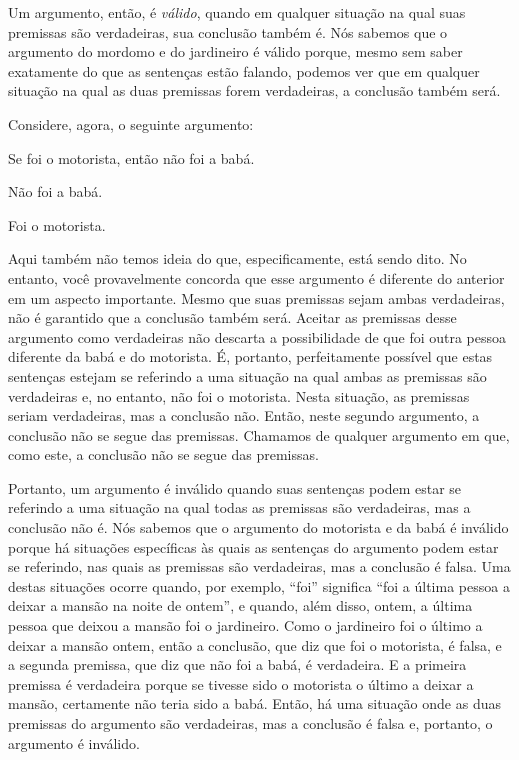 Um argumento, então, é \emph{válido}, quando em qualquer situação na qual suas premissas são verdadeiras, sua conclusão também é.
Nós sabemos que o argumento do mordomo e do jardineiro é válido porque, mesmo sem saber exatamente do que as sentenças estão falando, podemos ver que em qualquer situação na qual as duas premissas forem verdadeiras, a conclusão também será.

Considere, agora, o seguinte argumento:
\begin{earg}\label{argMaidDriver}
	\item[] Se foi o motorista, então não foi a babá.
	\item[] Não foi a babá.
	\item[\therefore] Foi o motorista.
\end{earg}
Aqui também não temos ideia do que, especificamente, está sendo dito.
No entanto, você provavelmente concorda que esse argumento é diferente do anterior em um aspecto importante.
Mesmo que suas premissas sejam ambas verdadeiras, não é garantido que a conclusão também será.
Aceitar as premissas desse argumento como verdadeiras não descarta a possibilidade de que foi outra pessoa diferente da babá e do motorista.
É, portanto, perfeitamente possível que estas sentenças estejam se referindo a uma situação na qual ambas as premissas são verdadeiras e, no entanto, não foi o motorista.
Nesta situação, as premissas seriam verdadeiras, mas a conclusão não.
Então, neste segundo argumento, a conclusão não se segue das premissas.
Chamamos de  qualquer argumento em que, como este, a conclusão não se segue das premissas.

Portanto, um argumento é inválido quando suas sentenças podem estar se referindo a uma situação na qual todas as premissas são verdadeiras, mas a conclusão não é.
Nós sabemos que o argumento do motorista e da babá é inválido porque há situações específicas às quais as sentenças do argumento podem estar se referindo, nas quais as premissas são verdadeiras, mas a conclusão é falsa.
Uma destas situações ocorre quando, por exemplo, ``foi'' significa ``foi a última pessoa a deixar a mansão na noite de ontem'', e quando, além disso, ontem, a última pessoa que deixou a mansão foi o jardineiro.
Como o jardineiro foi o último a deixar a mansão ontem, então a conclusão, que diz que foi o motorista, é falsa, e a segunda premissa, que diz que não foi a babá, é verdadeira.
E a primeira premissa é verdadeira porque se tivesse sido o motorista o último a deixar a mansão, certamente não teria sido a babá.
Então, há uma situação onde as duas premissas do argumento são verdadeiras, mas a conclusão é falsa e, portanto, o argumento é inválido.


